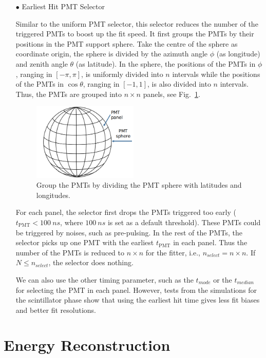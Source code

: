 \begin{itemize}
	\item[$\bullet$] Earliest Hit PMT Selector
	
	Similar to the uniform PMT selector, this selector reduces the number of the triggered PMTs to boost up the fit speed. It first groups the PMTs by their positions in the PMT support sphere. Take the centre of the sphere as coordinate origin, the sphere is divided by the azimuth angle $\phi$ (as longitude) and zenith angle $\theta$ (as latitude). In the sphere, the positions of the PMTs in $\phi$, ranging in $[-\pi,\pi]$, is uniformly divided into $n$ intervals while the positions of the PMTs in $\cos\theta$, ranging in $[-1, 1]$, is also divided into $n$ intervals. Thus, the PMTs are grouped into $n\times n$ panels, see Fig.~\ref{GroupPMTs}. 
	\begin{figure}[!htb]
		\centering
		\includegraphics[width=5cm]{GroupPMTs.png}
		\caption{Group the PMTs by dividing the PMT sphere with latitudes and longitudes.}
		\label{GroupPMTs}
	\end{figure}
	
	For each panel, the selector first drops the PMTs triggered too early ($t_\mathrm{PMT}<100~ns$, where $100~ns$ is set as a default threshold). These PMTs could be triggered by noises, such as pre-pulsing. In the rest of the PMTs, the selector picks up one PMT with the earliest $t_\mathrm{PMT}$ in each panel. Thus the number of the PMTs is reduced to $n\times n$ for the fitter, i.e., $n_{select}=n\times n$. If $N\leq n_{select}$, the selector does nothing. 
	
	We can also use the other timing parameter, such as the $t_{mode}$ or the $t_{median}$ for selecting the PMT in each panel. However, tests from the simulations for the scintillator phase show that using the earliest hit time gives less fit biases and better fit resolutions.
\end{itemize}

\section{Energy Reconstruction}
 
